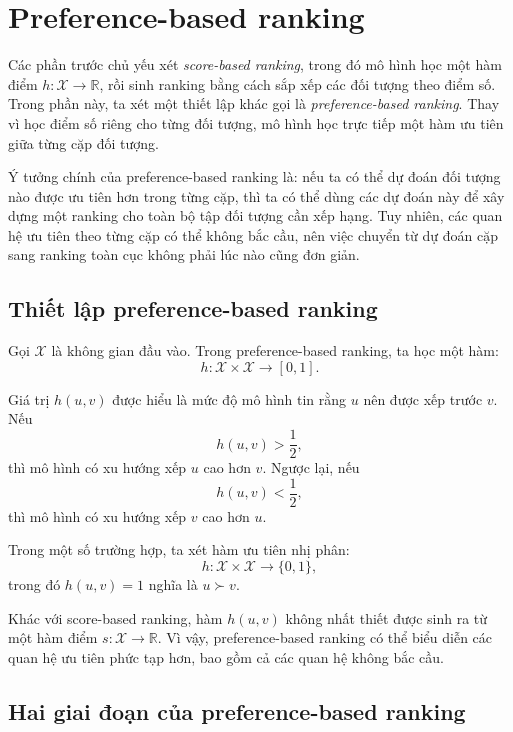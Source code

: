 \section{Preference-based ranking}

Các phần trước chủ yếu xét \textit{score-based ranking}, trong đó mô hình học một hàm điểm \(h:\mathcal{X}\rightarrow\mathbb{R}\), rồi sinh ranking bằng cách sắp xếp các đối tượng theo điểm số. Trong phần này, ta xét một thiết lập khác gọi là \textit{preference-based ranking}. Thay vì học điểm số riêng cho từng đối tượng, mô hình học trực tiếp một hàm ưu tiên giữa từng cặp đối tượng.

Ý tưởng chính của preference-based ranking là: nếu ta có thể dự đoán đối tượng nào được ưu tiên hơn trong từng cặp, thì ta có thể dùng các dự đoán này để xây dựng một ranking cho toàn bộ tập đối tượng cần xếp hạng. Tuy nhiên, các quan hệ ưu tiên theo từng cặp có thể không bắc cầu, nên việc chuyển từ dự đoán cặp sang ranking toàn cục không phải lúc nào cũng đơn giản.

\subsection{Thiết lập preference-based ranking}

Gọi \(\mathcal{X}\) là không gian đầu vào. Trong preference-based ranking, ta học một hàm:
\begin{equation}
    h:\mathcal{X}\times\mathcal{X}\rightarrow[0,1].
    \label{eq:section7-preference-function}
\end{equation}

Giá trị \(h(u,v)\) được hiểu là mức độ mô hình tin rằng \(u\) nên được xếp trước \(v\). Nếu
\[
    h(u,v)>\frac{1}{2},
\]
thì mô hình có xu hướng xếp \(u\) cao hơn \(v\). Ngược lại, nếu
\[
    h(u,v)<\frac{1}{2},
\]
thì mô hình có xu hướng xếp \(v\) cao hơn \(u\).

Trong một số trường hợp, ta xét hàm ưu tiên nhị phân:
\[
    h:\mathcal{X}\times\mathcal{X}\rightarrow\{0,1\},
\]
trong đó \(h(u,v)=1\) nghĩa là \(u\succ v\).

Khác với score-based ranking, hàm \(h(u,v)\) không nhất thiết được sinh ra từ một hàm điểm \(s:\mathcal{X}\rightarrow\mathbb{R}\). Vì vậy, preference-based ranking có thể biểu diễn các quan hệ ưu tiên phức tạp hơn, bao gồm cả các quan hệ không bắc cầu.

\subsection{Hai giai đoạn của preference-based ranking}

